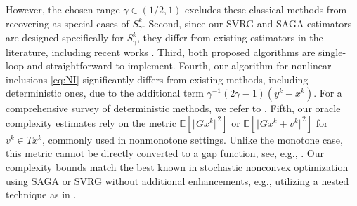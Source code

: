 \documentclass{article}
\newcommand{\norms}[1]{\Vert#1\Vert}
\theoremstyle{plain}
\theoremstyle{definition}
\theoremstyle{remark}
\begin{document}
However, the chosen range $\gamma \in (1/2, 1)$ excludes these classical methods from recovering as special cases of $S_{\gamma}^k$.
Second, since our SVRG and SAGA estimators are designed specifically for $S_{\gamma}^k$, they differ from existing estimators in the literature, including recent works \citep{alacaoglu2022beyond,alacaoglu2021stochastic,bot2019forward}.
Third, both proposed algorithms are single-loop and straightforward to implement.
Fourth, our algorithm for nonlinear inclusions \eqref{eq:NI} significantly differs from existing methods, including deterministic ones, due to the additional term $\gamma^{-1}(2\gamma-1)(y^k-x^k)$.
For a comprehensive survey of deterministic methods, we refer to \cite{tran2023sublinear}.
Fifth, our oracle complexity estimates rely on the metric $\mathbb{E}[\norms{Gx^k}^2]$ or $\mathbb{E}[\norms{Gx^k+v^k}^2]$ for $v^k\in Tx^k$, commonly used in nonmonotone settings. 
Unlike the monotone case, this metric cannot be directly converted to a gap function, see, e.g., \cite{alacaoglu2022beyond,alacaoglu2021stochastic}. 
Our complexity bounds match the best known in stochastic nonconvex optimization using SAGA or SVRG without additional enhancements, e.g., utilizing a nested technique as in \cite{zhou2018stochastic}.
\end{document}
